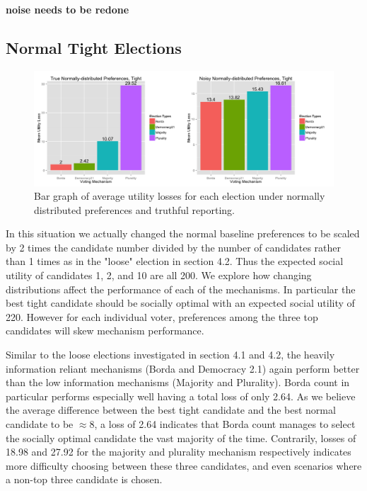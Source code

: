 \documentclass[11pt]{scrartcl}
\begin{document}
\textbf{noise needs to be redone}


\subsection{Normal Tight Elections}

\begin{figure}[H]\center
\includegraphics[scale=0.38]{normal_tight.png}
\caption{Bar graph of average utility losses for each election under normally distributed preferences and truthful reporting.}
\end{figure}

In this situation we actually changed the normal baseline preferences to be scaled by 2 times the candidate number divided by the number of candidates rather than 1 times as in the "loose" election in section 4.2. Thus the expected social utility of candidates 1, 2, and 10 are all 200. We explore how changing distributions affect the performance of each of the mechanisms. In particular the best tight candidate should be socially optimal with an expected social utility of 220. However for each individual voter, preferences among the three top candidates will skew mechanism performance.

Similar to the loose elections investigated in section 4.1 and 4.2, the heavily information reliant mechanisms (Borda and Democracy 2.1) again perform better than the low information mechanisms (Majority and Plurality). Borda count in particular performs especially well having a total loss of only 2.64. As we believe the average difference between the best tight candidate and the best normal candidate to be $\approx 8$, a loss of 2.64 indicates that Borda count manages to select the socially optimal candidate the vast majority of the time. Contrarily, losses of 18.98 and 27.92 for the majority and plurality mechanism respectively indicates more difficulty choosing between these three candidates, and even scenarios where a non-top three candidate is chosen.
\end{document}
